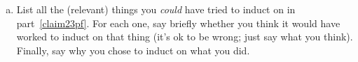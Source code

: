 \documentclass{article}
\newcommand{\meta}[1]{{\color{blue}#1}}
\begin{document}
\begin{enumerate}[leftmargin=*,itemindent=*,start=6,label={{\bf Problem \arabic*}.},ref=\arabic*]
\begin{enumerate}[(a)]
\begin{proof}
    \end{proof}
  \item List all the (relevant) things you \emph{could} have tried to induct on in part~\ref{claim23pf}.
    For each one, say briefly whether you think it would have worked to induct on that thing
    (it's ok to be wrong; just say what you think).
    Finally, say why you chose to induct on what you did.


\end{enumerate}
\end{enumerate}
\end{document}
